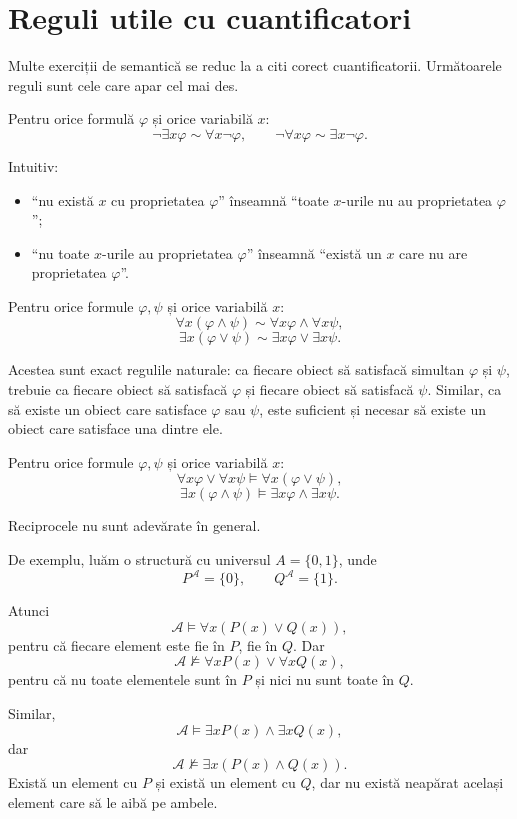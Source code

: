 \section{Reguli utile cu cuantificatori}

Multe exerciții de semantică se reduc la a citi corect cuantificatorii. Următoarele reguli sunt cele care apar cel mai des.

\begin{prop}
	Pentru orice formulă \( \varphi \) și orice variabilă \(x\):
	\[
		\neg \exists x \varphi \sim \forall x \neg \varphi,
		\qquad
		\neg \forall x \varphi \sim \exists x \neg \varphi.
	\]
\end{prop}

Intuitiv:
\begin{itemize}
	\item ``nu există \(x\) cu proprietatea \(\varphi\)'' înseamnă ``toate \(x\)-urile nu au proprietatea \(\varphi\)'';
	\item ``nu toate \(x\)-urile au proprietatea \(\varphi\)'' înseamnă ``există un \(x\) care nu are proprietatea \(\varphi\)''.
\end{itemize}

\begin{prop}
	Pentru orice formule \( \varphi, \psi \) și orice variabilă \(x\):
	\[
		\forall x(\varphi \land \psi) \sim \forall x\varphi \land \forall x\psi,
	\]
	\[
		\exists x(\varphi \lor \psi) \sim \exists x\varphi \lor \exists x\psi.
	\]
\end{prop}

Acestea sunt exact regulile naturale: ca fiecare obiect să satisfacă simultan \(\varphi\) și \(\psi\), trebuie ca fiecare obiect să satisfacă \(\varphi\) și fiecare obiect
să satisfacă \(\psi\). Similar, ca să existe un obiect care satisface \(\varphi\) sau \(\psi\), este suficient și necesar să existe un obiect care satisface una dintre ele.

\begin{prop}
	Pentru orice formule \( \varphi, \psi \) și orice variabilă \(x\):
	\[
		\forall x\varphi \lor \forall x\psi \models \forall x(\varphi \lor \psi),
	\]
	\[
		\exists x(\varphi \land \psi) \models \exists x\varphi \land \exists x\psi.
	\]
\end{prop}

\begin{note}
	Reciprocele nu sunt adevărate în general.

	De exemplu, luăm o structură cu universul \(A=\{0,1\}\), unde
	\[
		P^\mathcal{A}=\{0\}, \qquad Q^\mathcal{A}=\{1\}.
	\]

	Atunci
	\[
		\mathcal{A} \models \forall x(P(x)\lor Q(x)),
	\]
	pentru că fiecare element este fie în \(P\), fie în \(Q\). Dar
	\[
		\mathcal{A} \not\models \forall xP(x)\lor \forall xQ(x),
	\]
	pentru că nu toate elementele sunt în \(P\) și nici nu sunt toate în \(Q\).

	Similar,
	\[
		\mathcal{A} \models \exists xP(x)\land \exists xQ(x),
	\]
	dar
	\[
		\mathcal{A} \not\models \exists x(P(x)\land Q(x)).
	\]
	Există un element cu \(P\) și există un element cu \(Q\), dar nu există neapărat același element care să le aibă pe ambele.
\end{note}

